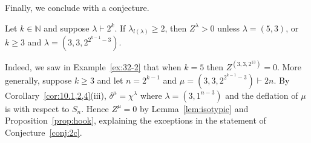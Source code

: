 \documentclass[ALCO, Unicode]{cedram}
\newcommand{\N}{\mathbb{N}}
\begin{document}
Finally, we conclude with a conjecture.
\begin{conjecture}\label{conj:2c}
	Let $k\in\N$ and suppose $\lambda\vdash 2^k$. If $\lambda_{l(\lambda)}\ge 2$, then $Z^\lambda>0$ unless $\lambda=(5,3)$, or $k\ge 3$ and $\lambda=(3,3,2^{2^{k-1}-3})$.
\end{conjecture}
Indeed, we saw in Example~\ref{ex:32-2} that when $k=5$ then $Z^{(3,3,2^{13})}=0$. More generally, suppose $k\ge 3$ and let $n=2^{k-1}$ and $\mu=(3,3,2^{2^{k-1}-3})\vdash 2n$. By Corollary~\ref{cor:10.1,2,4}(iii), $\delta^\mu=\chi^\lambda$ where $\lambda=(3,1^{n-3})$ and the deflation of $\mu$ is with respect to $S_n$. Hence $Z^\mu=0$ by Lemma~\ref{lem:isotypic} and Proposition~\ref{prop:hook}, explaining the exceptions in the statement of Conjecture~\ref{conj:2c}.


 





\end{document}
